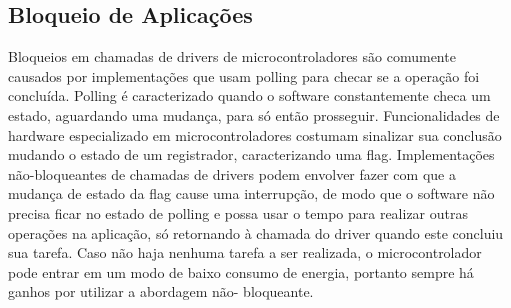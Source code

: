 \documentclass[11pt]{article}
\begin{document}
\subsection{Bloqueio de Aplicações}
\tab Bloqueios em chamadas de drivers de microcontroladores são comumente causados por implementações que usam polling para checar se a operação foi concluída. Polling é caracterizado
quando o software constantemente checa um estado, aguardando uma mudança, para só então
prosseguir. Funcionalidades de hardware especializado em microcontroladores costumam sinalizar sua
conclusão mudando o estado de um registrador, caracterizando uma flag. Implementações não-bloqueantes de chamadas de drivers podem envolver fazer com que a mudança de estado da flag cause
uma interrupção, de modo que o software não precisa ficar no estado de polling e possa usar o tempo
para realizar outras operações na aplicação, só retornando à chamada do driver quando este concluiu
sua tarefa. Caso não haja nenhuma tarefa a ser realizada, o microcontrolador pode entrar em um
modo de baixo consumo de energia, portanto sempre há ganhos por utilizar a abordagem não-
bloqueante.
\end{document}
